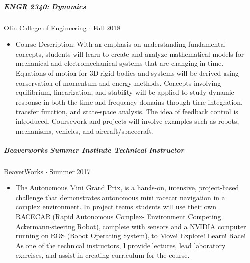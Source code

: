 \documentclass[10pt,letterpaper]{article}
\begin{document}
\subparagraph{ENGR 2340: Dynamics}
Olin College of Engineering $\cdot$ Fall 2018
\begin{itemize}
\item Course Description: With an emphasis on understanding fundamental concepts, students will learn to create and analyze mathematical models for mechanical and electromechanical systems that are changing in time. Equations of motion for 3D rigid bodies and systems will be derived using conservation of momentum and energy methods. Concepts involving equilibrium, linearization, and stability will be applied to study dynamic response in both the time and frequency domains through time-integration, transfer function, and state-space analysis. The idea of feedback control is introduced. Coursework and projects will involve examples such as robots, mechanisms, vehicles, and aircraft/spacecraft.
\end{itemize}

\subparagraph{Beaverworks Summer Institute Technical Instructor}
 BeaverWorks $\cdot$ Summer 2017
\begin{itemize}
    \item The Autonomous Mini Grand Prix, is a hands-on, intensive, project-based challenge that demonstrates autonomous mini racecar navigation in a complex environment. In project teams students will use their own RACECAR (Rapid Autonomous Complex- Environment Competing Ackermann-steering Robot), complete with sensors and a NVIDIA computer running on ROS (Robot Operating System), to Move! Explore! Learn! Race! As one of the technical instructors, I provide lectures, lead laboratory exercises, and assist in creating curriculum for the course.  
\end{itemize}
\end{document}
